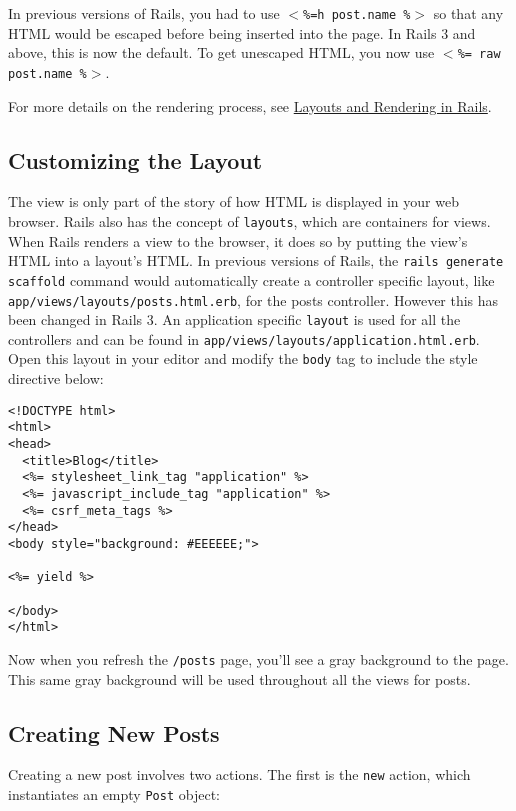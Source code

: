 \documentclass[10pt]{book}
\begin{document}
In previous versions of Rails, you had to use \texttt{$<$\%=h post.name \%$>$} so that any HTML would be escaped before being inserted into the page. In Rails 3 and above, this is now the default. To get unescaped HTML, you now use \texttt{$<$\%= raw post.name \%$>$}.

For more details on the rendering process, see \href{http://guides.rubyonrails.org/layouts_and_rendering.html}{Layouts and Rendering in Rails}.

\subsection{ Customizing the Layout}

The view is only part of the story of how HTML is displayed in your web browser. Rails also has the concept of \texttt{layouts}, which are containers for views. When Rails renders a view to the browser, it does so by putting the view’s HTML into a layout’s HTML. In previous versions of Rails, the \texttt{rails generate scaffold} command would automatically create a controller specific layout, like \texttt{app/views/layouts/posts.html.erb}, for the posts controller. However this has been changed in Rails 3. An application specific \texttt{layout} is used for all the controllers and can be found in \texttt{app/views/layouts/application.html.erb}. Open this layout in your editor and modify the \texttt{body} tag to include the style directive below:


\begin{verbatim}
<!DOCTYPE html>
<html>
<head>
  <title>Blog</title>
  <%= stylesheet_link_tag "application" %>
  <%= javascript_include_tag "application" %>
  <%= csrf_meta_tags %>
</head>
<body style="background: #EEEEEE;">
 
<%= yield %>
 
</body>
</html>
\end{verbatim}

Now when you refresh the \texttt{/posts} page, you’ll see a gray background to the page. This same gray background will be used throughout all the views for posts.

\subsection{ Creating New Posts}

Creating a new post involves two actions. The first is the \texttt{new} action, which instantiates an empty \texttt{Post} object:
\end{document}
